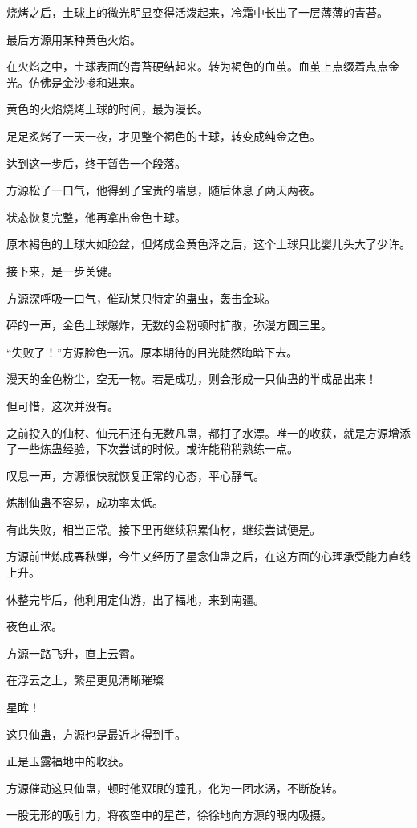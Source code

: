 \begin{this_body}
烧烤之后，土球上的微光明显变得活泼起来，冷霜中长出了一层薄薄的青苔。

最后方源用某种黄色火焰。

在火焰之中，土球表面的青苔硬结起来。转为褐色的血茧。血茧上点缀着点点金光。仿佛是金沙掺和进来。

黄色的火焰烧烤土球的时间，最为漫长。

足足炙烤了一天一夜，才见整个褐色的土球，转变成纯金之色。

达到这一步后，终于暂告一个段落。

方源松了一口气，他得到了宝贵的喘息，随后休息了两天两夜。

状态恢复完整，他再拿出金色土球。

原本褐色的土球大如脸盆，但烤成金黄色泽之后，这个土球只比婴儿头大了少许。

接下来，是一步关键。

方源深呼吸一口气，催动某只特定的蛊虫，轰击金球。

砰的一声，金色土球爆炸，无数的金粉顿时扩散，弥漫方圆三里。

“失败了！”方源脸色一沉。原本期待的目光陡然晦暗下去。

漫天的金色粉尘，空无一物。若是成功，则会形成一只仙蛊的半成品出来！

但可惜，这次并没有。

之前投入的仙材、仙元石还有无数凡蛊，都打了水漂。唯一的收获，就是方源增添了一些炼蛊经验，下次尝试的时候。或许能稍稍熟练一点。

叹息一声，方源很快就恢复正常的心态，平心静气。

炼制仙蛊不容易，成功率太低。

有此失败，相当正常。接下里再继续积累仙材，继续尝试便是。

方源前世炼成春秋蝉，今生又经历了星念仙蛊之后，在这方面的心理承受能力直线上升。

休整完毕后，他利用定仙游，出了福地，来到南疆。

夜色正浓。

方源一路飞升，直上云霄。

在浮云之上，繁星更见清晰璀璨

星眸！

这只仙蛊，方源也是最近才得到手。

正是玉露福地中的收获。

方源催动这只仙蛊，顿时他双眼的瞳孔，化为一团水涡，不断旋转。

一股无形的吸引力，将夜空中的星芒，徐徐地向方源的眼内吸摄。


\end{this_body}
